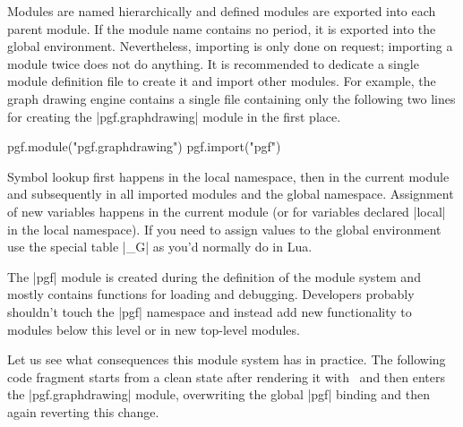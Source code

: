 Modules are named hierarchically and defined modules are exported into
each parent module.  If the module name contains no period, it is
exported into the global environment.  Nevertheless, importing is only
done on request; importing a module twice does not do anything.
It is recommended to dedicate a single module definition file
to create it and import other modules.  For example, the graph drawing
engine contains a single file containing only the following two lines for
creating the |pgf.graphdrawing| module in the first place.

\begin{codeexample}
pgf.module("pgf.graphdrawing")
pgf.import("pgf")
\end{codeexample}

Symbol lookup first happens in the local namespace, then in the
current module and subsequently in all imported modules and the global
namespace.  Assignment of new variables happens in the current module
(or for variables declared |local| in the local namespace).  If you
need to assign values to the global environment use the special table
|_G| as you'd normally do in Lua.

The |pgf| module is created during the definition of the module system
and mostly contains functions for loading and debugging.  Developers
probably shouldn't touch the |pgf| namespace and instead add new
functionality to modules below this level or in new top-level
modules.

Let us see what consequences this module system has in practice.  The
following code fragment starts from a clean state after rendering it
with \LuaTeX\ and then enters the |pgf.graphdrawing| module,
overwriting the global |pgf| binding and then again reverting this
change.

\begin{codeexample}
\usetikzlibrary{graphdrawing}

\end{codeexample}

